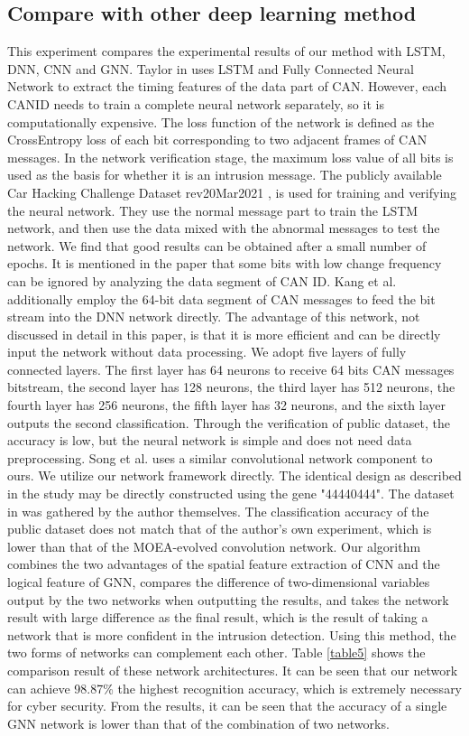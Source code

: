\documentclass[lettersize,journal]{IEEEtran}
\begin{document}
\subsection{Compare with other deep learning method}
This experiment compares the experimental results of our method with LSTM, DNN, CNN and GNN. Taylor in \cite{49} uses LSTM and Fully Connected Neural Network to extract the timing features of the data part of CAN. However, each CANID needs to train a complete neural network separately, so it is computationally expensive. The loss function of the network is defined as the CrossEntropy loss of each bit corresponding to two adjacent frames of CAN messages. In the network verification stage, the maximum loss value of all bits is used as the basis for whether it is an intrusion message. The publicly available Car Hacking Challenge Dataset rev20Mar2021 \cite{74}, is used for training and verifying the neural network. They use the normal message part to train the LSTM network, and then use the data mixed with the abnormal messages to test the network. We find that good results can be obtained after a small number of epochs. It is mentioned in the paper that some bits with low change frequency can be ignored by analyzing the data segment of CAN ID. Kang et al. \cite{75} additionally employ the 64-bit data segment of CAN messages to feed the bit stream into the DNN network directly. The advantage of this network, not discussed in detail in this paper, is that it is more efficient and can be directly input the network without data processing. We adopt five layers of fully connected layers. The first layer has 64 neurons to receive 64 bits CAN messages bitstream, the second layer has 128 neurons, the third layer has 512 neurons, the fourth layer has 256 neurons, the fifth layer has 32 neurons, and the sixth layer outputs the second classification. Through the verification of public dataset, the accuracy is low, but the neural network is simple and does not need data preprocessing. Song et al. \cite{48} uses a similar convolutional network component to ours. We utilize our network framework directly. The identical design as described in the study may be directly constructed using the gene "44440444". The dataset in \cite{48} was gathered by the author themselves. The classification accuracy of the public dataset does not match that of the author's own experiment, which is lower than that of the MOEA-evolved convolution network. Our algorithm combines the two advantages of the spatial feature extraction of CNN and the logical feature of GNN, compares the difference of two-dimensional variables output by the two networks when outputting the results, and takes the network result with large difference as the final result, which is the result of taking a network that is more confident in the intrusion detection. Using this method, the two forms of networks can complement each other. Table \ref{table5} shows the comparison result of these network architectures. It can be seen that our network can achieve 98.87\% the highest recognition accuracy, which is extremely necessary for cyber security. From the results, it can be seen that the accuracy of a single GNN network is lower than that of the combination of two networks.
\end{document}
